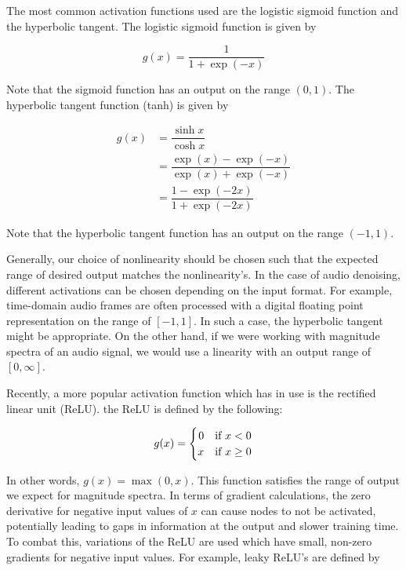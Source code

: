 The most common activation functions used are the logistic sigmoid function and the hyperbolic tangent. \cite{liu2014experiments} The logistic sigmoid function is given by

\begin{equation}
g(x) = \dfrac{1}{1+\exp{(-x)}}
\end{equation}

Note that the sigmoid function has an output on the range $(0,1)$. The hyperbolic tangent function (tanh) is given by

\begin{align}
g(x) &= \dfrac{\sinh{x}}{\cosh{x}}\\
&= \dfrac{\exp{(x)}-\exp{(-x)}}{\exp{(x)}+\exp{(-x)}}\\
&= \dfrac{1-\exp{(-2x)}}{1+\exp{(-2x)}}
\end{align}

Note that the hyperbolic tangent function has an output on the range $(-1,1)$.

Generally, our choice of nonlinearity should be chosen such that the expected range of desired output matches the nonlinearity's. In the case of audio denoising, different activations can be chosen depending on the input format. For example, time-domain audio frames are often processed with a digital floating point representation on the range of $[-1,1]$. In such a case, the hyperbolic tangent might be appropriate. On the other hand, if we were working with magnitude spectra of an audio signal, we would use a linearity with an output range of $[0,\infty]$.

Recently, a more popular activation function which has in use is the rectified linear unit (ReLU). the ReLU is defined by the following:

\begin{equation}
g(x) =
    \begin{cases}
        \hfill 0 & \text{if $x < 0$}\\
        \hfill x & \text{if $x \ge 0$}
    \end{cases}
\end{equation}

In other words, $g(x)=\max{(0,x)}$. This function satisfies the range of output we expect for magnitude spectra. In terms of gradient calculations, the zero derivative for negative input values of $x$ can cause nodes to not be activated, potentially leading to gaps in information at the output and slower training time. To combat this, variations of the ReLU are used which have small, non-zero gradients for negative input values. For example, leaky ReLU's are defined by

